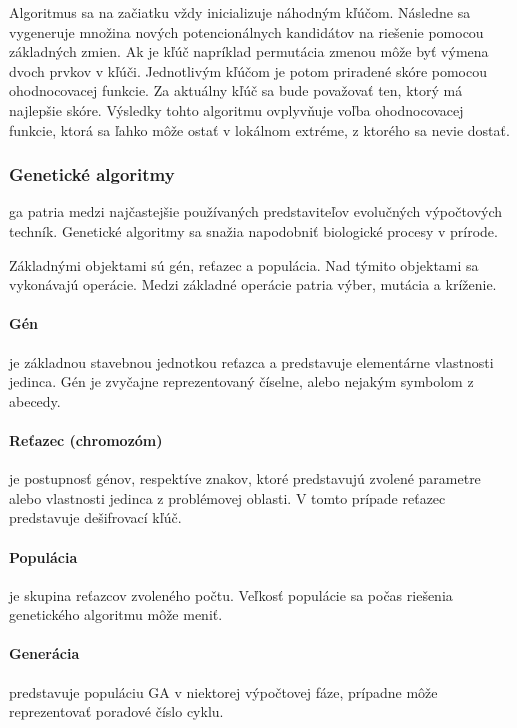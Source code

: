 Algoritmus sa na začiatku vždy inicializuje náhodným kľúčom. Následne sa vygeneruje množina nových potencionálnych kandidátov na riešenie
pomocou základných zmien. Ak je kľúč napríklad permutácia zmenou môže byť výmena dvoch prvkov v kľúči.
Jednotlivým kľúčom je potom priradené skóre pomocou ohodnocovacej funkcie.
Za aktuálny kľúč sa bude považovať ten, ktorý má najlepšie skóre.
Výsledky tohto algoritmu ovplyvňuje voľba ohodnocovacej funkcie, ktorá sa ľahko môže ostať v lokálnom extréme, z ktorého sa nevie dostať.

\subsubsection{Genetické algoritmy}
\acrfull{ga} patria medzi najčastejšie používaných predstaviteľov evolučných výpočtových techník.
Genetické algoritmy sa snažia napodobniť biologické procesy v prírode.

Základnými objektami sú gén, reťazec a populácia. Nad týmito objektami sa vykonávajú operácie.
Medzi základné operácie patria výber, mutácia a kríženie.

\paragraph{Gén} je základnou stavebnou jednotkou reťazca a predstavuje elementárne vlastnosti jedinca.
Gén je zvyčajne reprezentovaný číselne, alebo nejakým symbolom z abecedy.

\paragraph{Reťazec (chromozóm)} je postupnosť génov, respektíve znakov, ktoré predstavujú zvolené parametre alebo vlastnosti jedinca
z problémovej oblasti. V tomto prípade reťazec predstavuje dešifrovací kľúč. 

\paragraph{Populácia} je skupina reťazcov zvoleného počtu. Veľkosť populácie sa počas riešenia genetického algoritmu môže meniť.

\paragraph{Generácia} predstavuje populáciu GA v niektorej výpočtovej fáze, prípadne môže reprezentovať poradové číslo cyklu.

